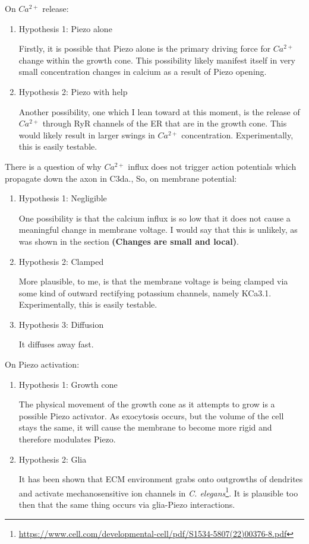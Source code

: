 \documentclass[12pt]{amsart}
\begin{document}
On $Ca^{2+}$ release: 
\begin{enumerate}
    \item Hypothesis 1: Piezo alone

    Firstly, it is possible that Piezo alone is the primary driving force for $Ca^{2+}$ change within the growth cone. This possibility likely manifest itself in very small concentration changes in calcium as a result of Piezo opening. 
    
    \item Hypothesis 2: Piezo with help

    Another possibility, one which I lean toward at this moment, is the release of $Ca^{2+}$ through RyR channels of the ER that are in the growth cone. This would likely result in larger swings in $Ca^{2+}$ concentration. Experimentally, this is easily testable. 
\end{enumerate}

\bigskip

 There is a question of why $Ca^{2+}$ influx does not trigger action potentials which propagate down the axon in C3da., So, on membrane potential: 
\begin{enumerate}
    \item Hypothesis 1: Negligible

   One possibility is that the calcium influx is so low that it does not cause a meaningful change in membrane voltage. I would say that this is unlikely, as was shown in the section \textbf{(Changes are small and local)}. 
    
    \item Hypothesis 2: Clamped

    More plausible, to me, is that the membrane voltage is being clamped via some kind of outward rectifying potassium channels, namely KCa3.1. Experimentally, this is easily testable. 

    \item Hypothesis 3: Diffusion

    It diffuses away fast.
\end{enumerate}

\bigskip



On Piezo activation: 
\begin{enumerate}
    \item Hypothesis 1: Growth cone

   The physical movement of the growth cone as it attempts to grow is a possible Piezo activator. As exocytosis occurs, but the volume of the cell stays the same, it will cause the membrane to become more rigid and therefore modulates Piezo.  
    
    \item Hypothesis 2: Glia

    It has been shown that ECM environment grabs onto outgrowths of dendrites and activate mechanosensitive ion channels in \textit{C. elegans}\footnote{\url{https://www.cell.com/developmental-cell/pdf/S1534-5807(22)00376-8.pdf}}. It is plausible too then that the same thing occurs via glia-Piezo interactions. 
\end{enumerate}
\end{document}

